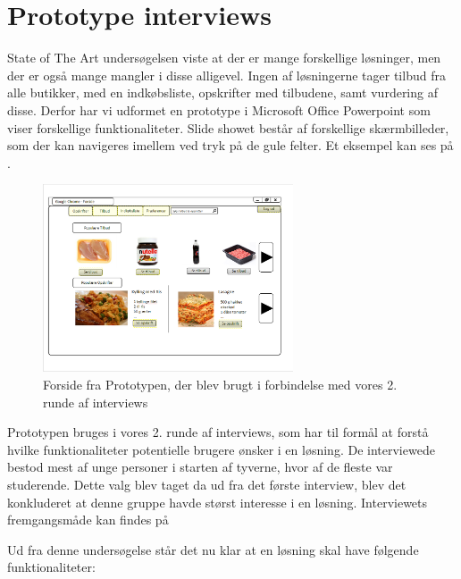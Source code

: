\section{Prototype interviews}\label{section:interview2}
State of The Art undersøgelsen viste at der er mange forskellige løsninger, men der er også mange mangler i disse alligevel.
Ingen af løsningerne tager tilbud fra alle butikker, med en indkøbsliste, opskrifter med tilbudene, samt vurdering af disse.
Derfor har vi udformet en prototype i Microsoft Office Powerpoint som viser forskellige funktionaliteter. 
Slide showet består af forskellige skærmbilleder, som der kan navigeres imellem ved tryk på de gule felter.
Et eksempel kan ses på .

\begin{figure}
\vspace{-20pt}
	\begin{center}
		\includegraphics[width=0.66\textwidth]{images/Images/prototype-forside.PNG}
	\end{center}
	\vspace{-20pt}
	\caption{Forside fra Prototypen, der blev brugt i forbindelse med vores 2. runde af interviews}\label{ss:Prototype}
	\vspace{-20pt}
\end{figure}

Prototypen bruges i vores 2. runde af interviews, som har til formål at forstå hvilke funktionaliteter potentielle brugere ønsker i en løsning.
De interviewede bestod mest af unge personer i starten af tyverne, hvor af de fleste var studerende.
Dette valg blev taget da ud fra det første interview, blev det konkluderet at denne gruppe havde størst interesse i en løsning.
Interviewets fremgangsmåde kan findes på 

Ud fra denne undersøgelse står det nu klar at en løsning skal have følgende funktionaliteter:

